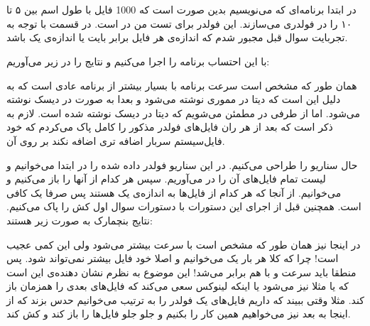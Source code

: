 \section{}
در ابتدا برنامه‌ای که می‌نویسیم بدین صورت است که 1000 فایل با طول اسم بین ۵ تا ۱۰ را در فولدری می‌سازند.
این فولدر برای تست من در
است. در قسمت
با توجه به تجربایت سوال قبل مجبور شدم که اندازه‌ی هر فایل برابر
بایت یا اندازه‌ی یک
باشد.

با این احتساب برنامه را اجرا می‌کنیم و نتایج را در زیر می‌آوریم:


همان طور که مشخص است سرعت برنامه با
بسیار بیشتر از برنامه عادی است که به دلیل این است که دیتا در مموری نوشته می‌شود و بعدا به صورت
در دیسک نوشته می‌شود. اما از طرفی در
مطمئن می‌شویم که دیتا در دیسک نوشته شده است. لازم به ذکر است که بعد از هر ران فایل‌های فولدر مذکور را کامل پاک می‌کردم
که خود فایل‌سیستم سربار اضافه تری اضافه نکند بر روی آن.

حال سناریو
را طراحی می‌کنیم. در این سناریو فولدر داده شده را در ابتدا می‌خوانیم و لیست تمام فایل‌های آن را در می‌آوریم.
سپس هر کدام از آنها را باز می‌کنیم و می‌خوانیم. از آنجا که هر کدام از فایل‌ها به اندازه‌ی یک
هستند پس صرفا یک
کافی است. همچنین قبل از اجرای این دستورات با دستورات سوال اول کش را پاک می‌کنیم. نتایج بنچمارک به صورت زیر هستند:



در اینجا نیز همان طور که مشخص است با
سرعت بیشتر می‌شود ولی این کمی عجیب است! چرا که کلا هر بار یک
می‌خوانیم و اصلا خود فایل بیشتر نمی‌تواند
شود. پس منطقا باید سرعت
 و 
با هم برابر می‌شد! این موضوع به نظرم نشان دهنده‌ی این است که یا مثلا
نیز
می‌شود یا اینکه لینوکس سعی می‌کند که فایل‌های بعدی را همزمان باز کند. مثلا وقتی ببیند که داریم فایل‌های
یک فولدر را به ترتیب می‌خوانیم حدس بزند که از اینجا به بعد نیز می‌خواهیم همین کار
را بکنیم و جلو جلو فایل‌ها را باز کند و کش کند.